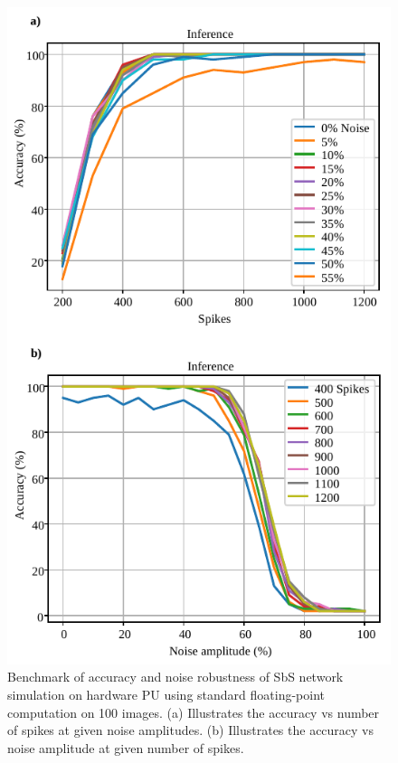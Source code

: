 \begin{figure}[h!]
	\centering
	\includegraphics[width=1\columnwidth]{../figures/accuracy_vs_noise_pu_fp.pdf}
	\caption{Benchmark of accuracy and noise robustness of SbS network simulation on hardware PU using standard floating-point computation on 100 images. (a) Illustrates the accuracy vs number of spikes at given noise amplitudes. (b) Illustrates the accuracy vs noise amplitude at given number of spikes.}
	\label{fig:accuracy_vs_noise_pu_fp}
\end{figure}


